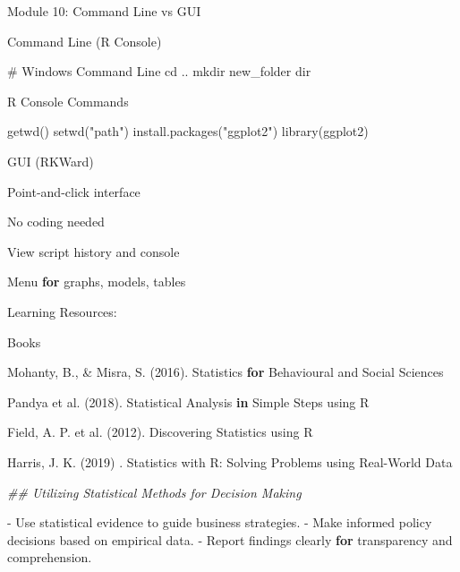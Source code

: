 \documentclass[
  letterpaper,
  DIV=11,
  numbers=noendperiod]{scrreprt}
\newenvironment{Shaded}{\begin{snugshade}}{\end{snugshade}}
\newcommand{\CommentTok}[1]{\textcolor[rgb]{0.37,0.37,0.37}{#1}}
\newcommand{\ControlFlowTok}[1]{\textcolor[rgb]{0.00,0.23,0.31}{\textbf{#1}}}
\newcommand{\DecValTok}[1]{\textcolor[rgb]{0.68,0.00,0.00}{#1}}
\newcommand{\DocumentationTok}[1]{\textcolor[rgb]{0.37,0.37,0.37}{\textit{#1}}}
\newcommand{\FunctionTok}[1]{\textcolor[rgb]{0.28,0.35,0.67}{#1}}
\newcommand{\NormalTok}[1]{\textcolor[rgb]{0.00,0.23,0.31}{#1}}
\newcommand{\SpecialCharTok}[1]{\textcolor[rgb]{0.37,0.37,0.37}{#1}}
\newcommand{\StringTok}[1]{\textcolor[rgb]{0.13,0.47,0.30}{#1}}
\begin{document}
\begin{Shaded}
\begin{Highlighting}[]
\NormalTok{Module }\DecValTok{10}\SpecialCharTok{:}\NormalTok{ Command Line vs GUI}

\NormalTok{Command }\FunctionTok{Line}\NormalTok{ (R Console)}

\CommentTok{\# Windows Command Line}
\NormalTok{cd ..}
\NormalTok{mkdir new\_folder}
\NormalTok{dir}

\NormalTok{R Console Commands}

\FunctionTok{getwd}\NormalTok{()}
\FunctionTok{setwd}\NormalTok{(}\StringTok{"path"}\NormalTok{)}
\FunctionTok{install.packages}\NormalTok{(}\StringTok{"ggplot2"}\NormalTok{)}
\FunctionTok{library}\NormalTok{(ggplot2)}

\FunctionTok{GUI}\NormalTok{ (RKWard)}

\NormalTok{Point}\SpecialCharTok{{-}}\NormalTok{and}\SpecialCharTok{{-}}\NormalTok{click interface}

\NormalTok{No coding needed}

\NormalTok{View script history and console}

\NormalTok{Menu }\ControlFlowTok{for}\NormalTok{ graphs, models, tables}

\NormalTok{Learning Resources}\SpecialCharTok{:}

\NormalTok{Books}

\NormalTok{Mohanty, B., }\SpecialCharTok{\&}\NormalTok{ Misra, }\FunctionTok{S.}\NormalTok{ (}\DecValTok{2016}\NormalTok{). Statistics }\ControlFlowTok{for}\NormalTok{ Behavioural and Social Sciences}

\NormalTok{Pandya et }\FunctionTok{al.}\NormalTok{ (}\DecValTok{2018}\NormalTok{). Statistical Analysis }\ControlFlowTok{in}\NormalTok{ Simple Steps using R}

\NormalTok{Field, A. P. et }\FunctionTok{al.}\NormalTok{ (}\DecValTok{2012}\NormalTok{). Discovering Statistics using R}

\NormalTok{Harris, J. }\FunctionTok{K.}\NormalTok{ (}\DecValTok{2019}\NormalTok{) . Statistics with R}\SpecialCharTok{:}\NormalTok{ Solving Problems using Real}\SpecialCharTok{{-}}\NormalTok{World Data}

\DocumentationTok{\#\# Utilizing Statistical Methods for Decision Making}

\SpecialCharTok{{-}}\NormalTok{ Use statistical evidence to guide business strategies.}
\SpecialCharTok{{-}}\NormalTok{ Make informed policy decisions based on empirical data.}
\SpecialCharTok{{-}}\NormalTok{ Report findings clearly }\ControlFlowTok{for}\NormalTok{ transparency and comprehension.}


\end{Highlighting}
\end{Shaded}
\end{document}
